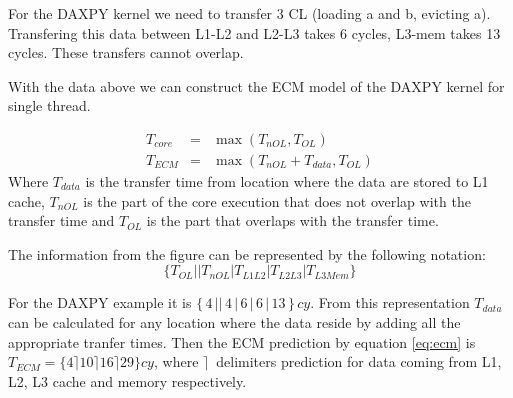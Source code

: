 For the DAXPY kernel we need to transfer 3 CL (loading a and b, evicting a). Transfering this data between L1-L2 and L2-L3 takes 6 cycles, L3-mem takes 13 cycles. These transfers cannot overlap.

With the data above we can construct the ECM model of the DAXPY kernel for single thread.

\begin{eqnarray}
    T_{core} & = & \max(T_{nOL}, T_{OL}) \\
    T_{ECM} & = & \max(T_{nOL}+T_{data}, T_{OL}) \label{eq:ecm}
\end{eqnarray}
Where $T_{data}$ is the transfer time from location where the data are stored to L1 cache, $T_{nOL}$ is the part of the core execution that does not overlap with the transfer time and $T_{OL}$ is the part that overlaps with the transfer time.

The information from the figure  can be represented by the following notation:
\begin{equation}
    \{T_{OL} || T_{nOL} | T_{L1L2} | T_{L2L3} | T_{L3Mem}\}
\end{equation}

For the DAXPY example it is $\{\,4\,||\,4\,|\,6\,|\,6\,|\,13\,\}\,cy$.
From this representation $T_{data}$ can be calculated for any location where the data reside by adding all the appropriate tranfer times.
Then the ECM prediction by equation \ref{eq:ecm} is $T_{ECM} = \{4 \rceil 10 \rceil 16 \rceil 29\} cy$, where $\rceil$~delimiters prediction for data coming from L1, L2, L3 cache and memory respectively.

